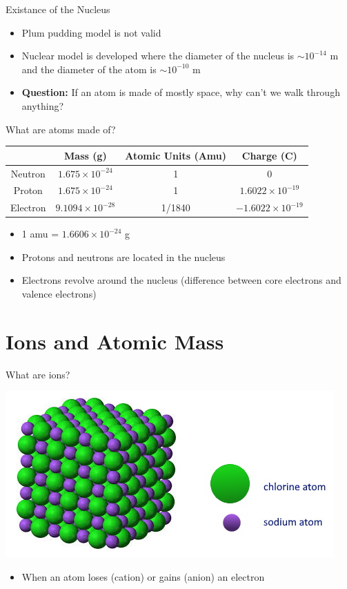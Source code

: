 \documentclass[11pt]{beamer}
\begin{document}
\begin{frame}{Existance of the Nucleus}
  \begin{itemize}
  \item Plum pudding model is not valid
  \item Nuclear model is developed where the diameter of the nucleus
    is $\sim 10^{-14}$ m and the diameter of the atom is $\sim 10^{-10}$ m
  \item \textbf{Question:} If an atom is made of mostly space,
    why can't we walk through anything?
  \end{itemize}
\end{frame}

\begin{frame}{What are atoms made of?}
  \centering
  \begin{tabular}{c|ccc}
    & Mass (g) & Atomic Units (Amu) & Charge (C) \\
    \hline
    Neutron  & $1.675\times 10^{-24}$ & 1 & 0 \\
    Proton   & $1.675\times 10^{-24}$ & 1 & $1.6022\times 10^{-19}$ \\
    Electron & $9.1094\times 10^{-28}$ & 1/1840 & $-1.6022\times 10^{-19}$
  \end{tabular}

  \begin{itemize}
  \item 1 amu = $1.6606 \times 10^{-24}$ g
  \item Protons and neutrons are located in the nucleus
  \item Electrons revolve around the nucleus (difference between
    core electrons and valence electrons)
  \end{itemize}
\end{frame}

\section{Ions and Atomic Mass}

\begin{frame}{What are ions?}
  \begin{center}
    \includegraphics[scale=0.5]{nacl}
  \end{center}

  \begin{itemize}
  \item When an atom loses (cation) or gains (anion) an electron
  \end{itemize}
\end{frame}
\end{document}
